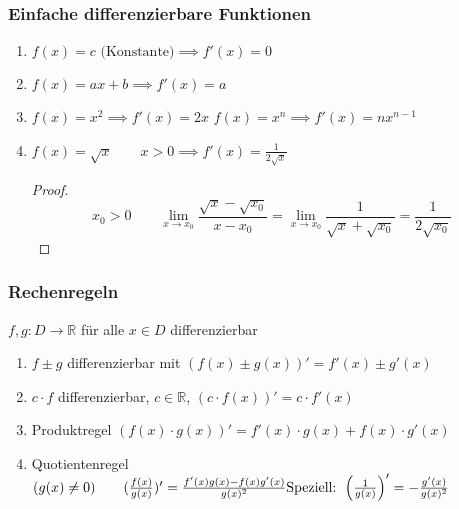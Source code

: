 \subsubsection*{Einfache differenzierbare Funktionen}
\begin{enumerate}
	\item \( f(x)=c \text{ (Konstante)} \implies f'(x)=0 \)
	\item \( f(x)=ax+b \implies f'(x)=a \)
	\item \(f(x)=x^2 \implies f'(x)=2x \)\newline
		  \(f(x)=x^n \implies f'(x)=nx^{n-1} \)
	\item \( f(x)=\sqrt{x} \qquad x>0 \implies f'(x)=\frac{1}{2\sqrt{x}} \)
	 \begin{proof}
	   \[ x_0>0 \qquad \lim_{x \rightarrow x_0}\frac{\sqrt{x}-\sqrt{x_0}}{x-x_0} =
            \lim_{x \rightarrow x_0}\frac{1}{\sqrt{x}+\sqrt{x_0}}=\frac{1}{2\sqrt{x_0}} \]
	 \end{proof}

\end{enumerate}


\begin{center}
\label{Wurzelfunktion}
\end{center}


\subsubsection*{Rechenregeln} %
\label{sub:rechenregeln}

\( f,g:D\rightarrow\mathbb{R} \) für alle \( x \in D \) differenzierbar

\begin{enumerate}
	\item \( f \pm g \) differenzierbar mit \( (f(x)\pm g(x))'=f'(x)\pm g'(x) \)
	\item \( c \cdot f \) differenzierbar, \( c \in \mathbb{R} \), \( (c \cdot f(x))'=c\cdot f'(x) \)
	\item Produktregel \( (f(x) \cdot g(x))' = f'(x) \cdot g(x)+f(x) \cdot g'(x) \)
	\item Quotientenregel \( (g(x) \neq 0) \qquad (\frac{f(x)}{g(x)})'=\frac{f'(x)g(x)-f(x)g'(x)}{g(x)^2} \newline
          \text{Speziell: } \left(\frac{1}{g(x)}\right)'=-\frac{g'(x)}{g(x)^2}\)
\end{enumerate}

